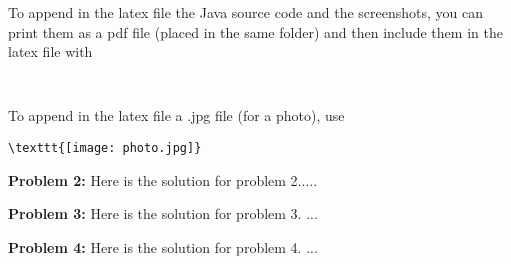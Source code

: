 \documentclass[12pt,letterpaper,final]{report}
\begin{document}
To append in the  latex file the Java source code and the screenshots, you can print them  as a pdf file (placed in the same folder) and then include them  in the latex file with 
\begin{verbatim}


\end{verbatim}
To append in the  latex file a .jpg file (for a photo), use 
\begin{verbatim}
\texttt{[image: photo.jpg]}

\end{verbatim}




\noindent\textbf{Problem 2:} Here is the solution for problem 2.....





\bigskip

\noindent\textbf{Problem 3:} Here is the solution for problem 3. ...


\bigskip

\noindent\textbf{Problem 4:}  Here is the solution for problem 4. ...
\end{document}
